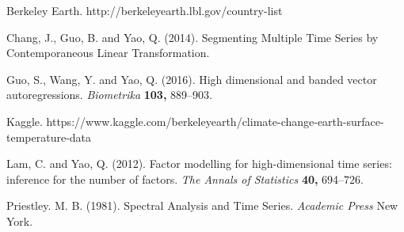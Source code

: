 \documentclass[11pt]{article}
\theoremstyle{plain}
\theoremstyle{definition}
\begin{document}
 
\begin{thebibliography}{9}
	
	 Berkeley Earth. http://berkeleyearth.lbl.gov/country-list
	
	 Chang, J., Guo, B. and Yao, Q. (2014). Segmenting Multiple Time Series by Contemporaneous Linear Transformation. 
	
	 Guo, S., Wang, Y. and Yao, Q. (2016). High dimensional and banded vector autoregressions.
	\textit{Biometrika} \textbf{103,} 889--903. 
	
	 Kaggle. https://www.kaggle.com/berkeleyearth/climate-change-earth-surface-temperature-data
	
	 Lam, C. and Yao, Q. (2012). Factor modelling for high-dimensional time series: inference for the number of factors. \textit{The Annals of Statistics} \textbf{40,} 694--726. 
	
	 Priestley. M. B. (1981). Spectral Analysis and Time Series. \textit{Academic Press} New York.
	
\end{thebibliography}
\end{document}
